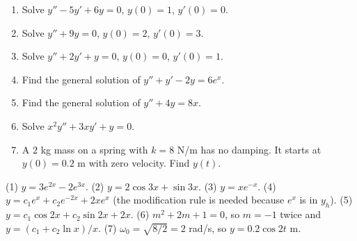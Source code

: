 \begin{practicebox}
\begin{enumerate}
  \item Solve $y'' - 5y' + 6y = 0$, \; $y(0)=1$, \; $y'(0)=0$.
  \item Solve $y'' + 9y = 0$, \; $y(0)=2$, \; $y'(0)=3$.
  \item Solve $y'' + 2y' + y = 0$, \; $y(0)=0$, \; $y'(0)=1$.
  \item Find the general solution of $y'' + y' - 2y = 6e^{x}$.
  \item Find the general solution of $y'' + 4y = 8x$.
  \item Solve $x^2y'' + 3xy' + y = 0$.
  \item A $2$ kg mass on a spring with $k=8$ N/m has no damping. It starts at $y(0)=0.2$ m with zero velocity. Find $y(t)$.
\end{enumerate}
\end{practicebox}

\begin{answerbox}
(1) $y = 3e^{2x} - 2e^{3x}$. \quad (2) $y = 2\cos 3x + \sin 3x$. \quad (3) $y = xe^{-x}$. \quad (4) $y = c_1e^{x} + c_2e^{-2x} + 2xe^{x}$ (the modification rule is needed because $e^{x}$ is in $y_h$). \quad (5) $y = c_1\cos 2x + c_2\sin 2x + 2x$. \quad (6) $m^2 + 2m + 1 = 0$, so $m=-1$ twice and $y = (c_1 + c_2\ln x)/x$. \quad (7) $\omega_0 = \sqrt{8/2} = 2$ rad/s, so $y = 0.2\cos 2t$ m.
\end{answerbox}
